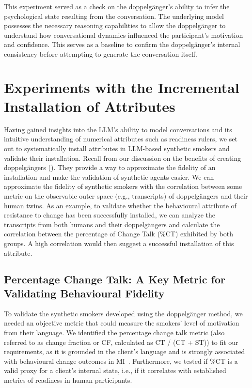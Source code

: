 This experiment served as a check on the doppelgänger's ability to infer the psychological state resulting from the conversation. The underlying model possesses the necessary reasoning capabilities to allow the doppelgänger to understand how conversational dynamics influenced the participant's motivation and confidence. This serves as a baseline to confirm the doppelgänger's internal consistency before attempting to generate the conversation itself.



\section{Experiments with the Incremental Installation of Attributes}
Having gained insights into the LLM's ability to model conversations and its intuitive understanding of numerical attributes such as readiness rulers, we set out to systematically install attributes in LLM-based synthetic smokers and validate their installation. Recall from our discussion on the benefits of creating doppelgängers (). They provide a way to approximate the fidelity of an installation and make the validation of synthetic agents easier. We can approximate the fidelity of synthetic smokers with the correlation between some metric on the observable outer space (e.g., transcripts) of doppelgängers and their human twins. As an example, to validate whether the behavioural attribute of resistance to change has been successfully installed, we can analyze the transcripts from both humans and their doppelgängers and calculate the correlation between the percentage of Change Talk (\%CT) exhibited by both groups. A high correlation would then suggest a successful installation of this attribute.


\subsection*{Percentage Change Talk: A Key Metric for Validating Behavioural Fidelity}

To validate the synthetic smokers developed using the doppelgänger method, we needed an objective metric that could measure the smokers' level of motivation from their language.
We identified the percentage change talk metric (also referred to as change fraction or CF, calculated as CT / (CT + ST)) to fit our requirements, as it is grounded in the client's language and is strongly associated with behavioural change outcomes in MI~\cite{Barnett2014,Houck2018,Moyers2009,Baer2008}.
Furthermore, we tested if \%CT is a valid proxy for a client's internal state, i.e., if it correlates with established metrics of readiness in human participants.

